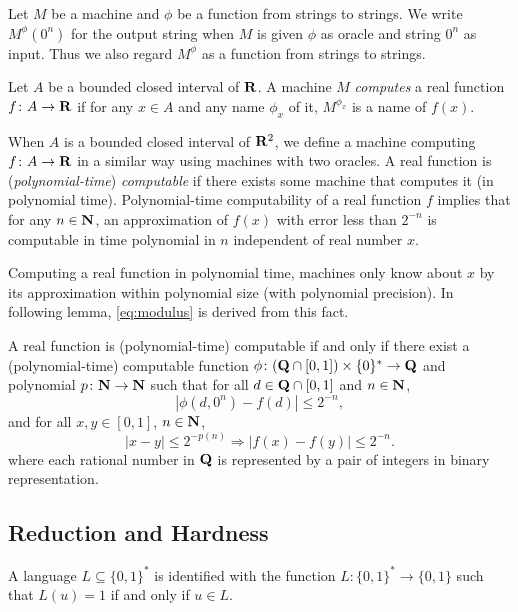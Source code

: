 Let $M$ be a machine and $\phi$ be a function from strings to strings. 
We write $M ^\phi (0 ^n)$ for the output string 
when $M$ is given
$\phi$ as oracle and string $0^n$ as input.
Thus we also regard $M^\phi$ as a function from strings to strings.

\begin{definition}
Let $A$ be a bounded closed interval of $\mathbf R$.
A machine $M$ \emph{computes} a real function $f \colon A \to \mathbf R$ 
if for any $x \in A$ and any name $\phi_x$ of it,
$M^{\phi_x}$ is a name of $f(x)$.
\end{definition}

When $A$ is a bounded closed interval of $\mathbf R ^2$,
we define a machine computing $f \colon A \to \mathbf R$ in a similar way using machines with two oracles.
A real function is (\emph{polynomial-time}) \emph{computable} if there exists some machine that computes it (in polynomial time).
Polynomial-time computability of a real function $f$ implies that
for any $n \in \mathbf N$, 
an approximation of $f(x)$ with error less than $2^{-n}$
is computable in time polynomial in $n$ 
independent of real number $x$.

Computing a real function in polynomial time, machines only know
about $x$ by its approximation within polynomial size (with polynomial precision).
In following lemma, \eqref{eq:modulus} is derived from this fact.

\begin{lemma}
 \label{lem:type1representation}
 A real function is (polynomial-time) computable if and only if
 there exist a (polynomial-time) computable function 
 $\phi \colon (\mathbf Q \cap [0, 1]) \times \{0\} ^* \to \mathbf Q$ and 
 polynomial $p \colon \mathbf N \to \mathbf N$ such that
 for all $d \in \mathbf Q \cap [0,1]$ and $n \in \mathbf N$,
 \begin{equation}
  |\phi(d, 0^n) - f(d)| \le 2^{-n},
 \end{equation}
 and for all $x, y \in [0, 1]$, $n \in \mathbf N$,
 \begin{equation} 
  |x-y| \le 2^{-p(n)} \Rightarrow |f(x) - f(y)| \le 2^{-n}. 
   \label{eq:modulus}
 \end{equation}
 where each rational number in $\mathbf Q$ is represented by a pair of integers in binary representation.
\end{lemma}

\subsection{Reduction and Hardness}
A language $L \subseteq \{0, 1\} ^*$ is identified with the function
$L \colon \{0, 1\} ^* \to \{0, 1\}$ such that $L (u) = 1$ if and only if $u \in L$.

